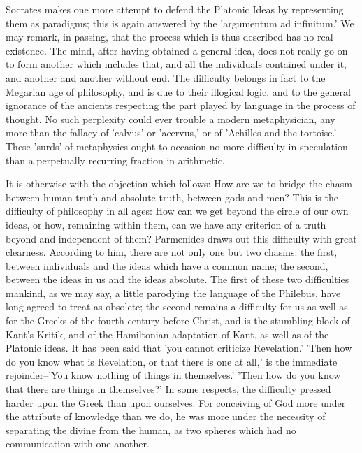 Socrates makes one more attempt to defend the Platonic Ideas by
representing them as paradigms; this is again answered by the
'argumentum ad infinitum.' We may remark, in passing, that the process
which is thus described has no real existence. The mind, after having
obtained a general idea, does not really go on to form another which
includes that, and all the individuals contained under it, and another
and another without end. The difficulty belongs in fact to the Megarian
age of philosophy, and is due to their illogical logic, and to the
general ignorance of the ancients respecting the part played by language
in the process of thought. No such perplexity could ever trouble
a modern metaphysician, any more than the fallacy of 'calvus' or
'acervus,' or of 'Achilles and the tortoise.' These 'surds' of
metaphysics ought to occasion no more difficulty in speculation than a
perpetually recurring fraction in arithmetic.

It is otherwise with the objection which follows: How are we to bridge
the chasm between human truth and absolute truth, between gods and men?
This is the difficulty of philosophy in all ages: How can we get beyond
the circle of our own ideas, or how, remaining within them, can we have
any criterion of a truth beyond and independent of them? Parmenides
draws out this difficulty with great clearness. According to him, there
are not only one but two chasms: the first, between individuals and the
ideas which have a common name; the second, between the ideas in us and
the ideas absolute. The first of these two difficulties mankind, as
we may say, a little parodying the language of the Philebus, have long
agreed to treat as obsolete; the second remains a difficulty for us as
well as for the Greeks of the fourth century before Christ, and is the
stumbling-block of Kant's Kritik, and of the Hamiltonian adaptation
of Kant, as well as of the Platonic ideas. It has been said that 'you
cannot criticize Revelation.' 'Then how do you know what is Revelation,
or that there is one at all,' is the immediate rejoinder--'You know
nothing of things in themselves.' 'Then how do you know that there are
things in themselves?' In some respects, the difficulty pressed harder
upon the Greek than upon ourselves. For conceiving of God more under the
attribute of knowledge than we do, he was more under the necessity
of separating the divine from the human, as two spheres which had no
communication with one another.

